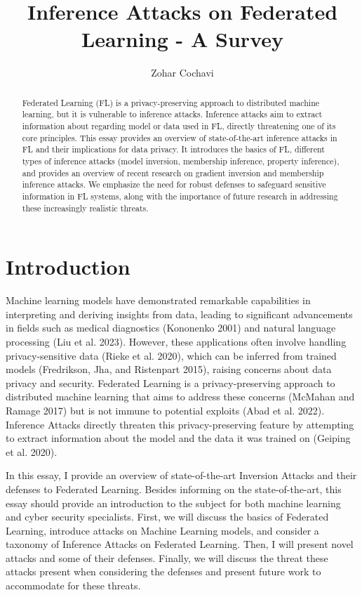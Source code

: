 \documentclass[
  compsoc]{IEEEtran}
\title{Inference Attacks on Federated Learning - A Survey}
\author{Zohar Cochavi}
\date{}
\begin{document}
\maketitle
\begin{abstract}
Federated Learning (FL) is a privacy-preserving approach to distributed
machine learning, but it is vulnerable to inference attacks. Inference
attacks aim to extract information about regarding model or data used in
FL, directly threatening one of its core principles. This essay provides
an overview of state-of-the-art inference attacks in FL and their
implications for data privacy. It introduces the basics of FL, different
types of inference attacks (model inversion, membership inference,
property inference), and provides an overview of recent research on
gradient inversion and membership inference attacks. We emphasize the
need for robust defenses to safeguard sensitive information in FL
systems, along with the importance of future research in addressing
these increasingly realistic threats.
\end{abstract}

\hypertarget{introduction}{%
\section{Introduction}\label{introduction}}

Machine learning models have demonstrated remarkable capabilities in
interpreting and deriving insights from data, leading to significant
advancements in fields such as medical diagnostics (Kononenko 2001) and
natural language processing (Liu et al. 2023). However, these
applications often involve handling privacy-sensitive data (Rieke et al.
2020), which can be inferred from trained models (Fredrikson, Jha, and
Ristenpart 2015), raising concerns about data privacy and security.
Federated Learning is a privacy-preserving approach to distributed
machine learning that aims to address these concerns (McMahan and Ramage
2017) but is not immune to potential exploits (Abad et al. 2022).
Inference Attacks directly threaten this privacy-preserving feature by
attempting to extract information about the model and the data it was
trained on (Geiping et al. 2020).

In this essay, I provide an overview of state-of-the-art Inversion
Attacks and their defenses to Federated Learning. Besides informing on
the state-of-the-art, this essay should provide an introduction to the
subject for both machine learning and cyber security specialists. First,
we will discuss the basics of Federated Learning, introduce attacks on
Machine Learning models, and consider a taxonomy of Inference Attacks on
Federated Learning. Then, I will present novel attacks and some of their
defenses. Finally, we will discuss the threat these attacks present when
considering the defenses and present future work to accommodate for
these threats.
\end{document}
